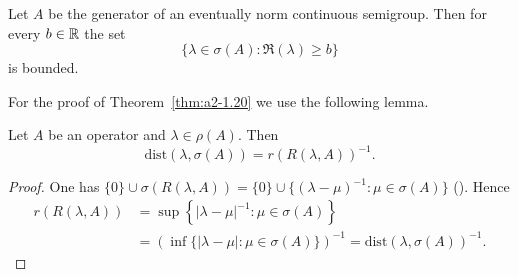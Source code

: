 \begin{theorem}\label{thm:a2-1.20}
Let $A$ be the generator of an eventually norm continuous semigroup.
Then for every $b \in \mathbb{R}$ the set
\[
    \{\lambda \in \sigma(A) \colon \Re(\lambda) \geq b\}
\]
is bounded.
\end{theorem}
For the proof of Theorem~\ref{thm:a2-1.20} we use the following lemma.
\begin{lemma}\label{lem:a2-1.21}
Let $A$ be an operator and $\lambda \in \rho(A)$.
Then
\[
    \mathrm{dist}(\lambda,\sigma(A)) = r(R(\lambda,A))^{-1}.
\]
\end{lemma}
\begin{proof}
One has $\{0\} \cup \sigma(R(\lambda,A)) = \{0\} \cup \{(\lambda-\mu)^{-1} \colon \mu \in \sigma(A)\}$ (\textcite[Lemma~ 2.11]{davies:1980}).
Hence 
\begin{align*}
r(R(\lambda,A)) &= \sup \left\{|\lambda-\mu|^{-1} \colon \mu \in \sigma(A)\right\} \\
& = 
\left(\inf \{|\lambda-\mu| \colon \mu \in \sigma(A)\}\right)^{-1} = \text{dist}(\lambda,\sigma(A))^{-1}.
\tag*{\qedsymbol}%
\end{align*}
\let\qedsymbol\relax
\end{proof}
